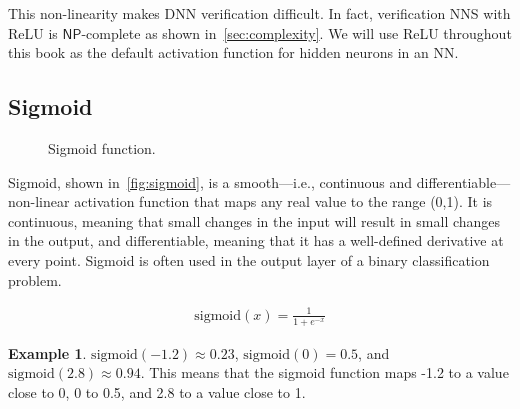 \documentclass[oneside,11pt,dvipsnames]{book}
\numberwithin{equation}{section}
\theoremstyle{definition}
\newtheorem{example}{Example}[section]
\theoremstyle{remark}
\newcommand{\sigmoid}[1]{\mathrm{sigmoid}\left(#1\right)}
\begin{document}
This non-linearity makes DNN verification difficult. In fact, verification NNS with ReLU is $\mathsf{NP}$-complete as shown in~\autoref{sec:complexity}. We will use ReLU throughout this book as the default activation function for hidden neurons in an NN.

\subsection{Sigmoid}\label{sec:sigmoid}



\begin{figure}[ht]
    \centering
    \caption{Sigmoid function.}\label{fig:sigmoid}
\end{figure}

Sigmoid, shown in~\autoref{fig:sigmoid}, is a smooth---i.e., continuous and differentiable---non-linear activation function that maps any real value to the range (0,1).
It is continuous, meaning that small changes in the input will result in small changes in the output, and differentiable, meaning that it has a well-defined derivative at every point. Sigmoid is often used in the output layer of a binary classification problem.

    \begin{align}
        \sigmoid{x} = \frac{1}{1+e^{-x}}
    \end{align}

\begin{example}
$\sigmoid{-1.2} \approx 0.23$, $\sigmoid{0} = 0.5$, and $\sigmoid{2.8} \approx 0.94$. This means that the sigmoid function maps -1.2 to a value close to 0, 0 to 0.5, and 2.8 to a value close to 1.
\end{example}
\end{document}
